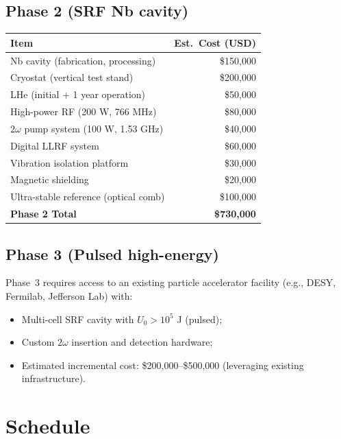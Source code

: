 \documentclass[12pt,letterpaper]{article}
\begin{document}
\subsection{Phase 2 (SRF Nb cavity)}

\begin{tabular}{lr}
\toprule
Item & Est.\ Cost (USD) \\
\midrule
Nb cavity (fabrication, processing) & \$150,000 \\
Cryostat (vertical test stand) & \$200,000 \\
LHe (initial + 1 year operation) & \$50,000 \\
High-power RF (200 W, 766 MHz) & \$80,000 \\
$2\omega$ pump system (100 W, 1.53 GHz) & \$40,000 \\
Digital LLRF system & \$60,000 \\
Vibration isolation platform & \$30,000 \\
Magnetic shielding & \$20,000 \\
Ultra-stable reference (optical comb) & \$100,000 \\
\midrule
\textbf{Phase 2 Total} & \textbf{\$730,000} \\
\bottomrule
\end{tabular}

\subsection{Phase 3 (Pulsed high-energy)}

Phase~3 requires access to an existing particle accelerator facility
(e.g., DESY, Fermilab, Jefferson Lab) with:
\begin{itemize}[noitemsep]
  \item Multi-cell SRF cavity with $U_0 > 10^5$ J (pulsed);
  \item Custom $2\omega$ insertion and detection hardware;
  \item Estimated incremental cost: \$200,000--\$500,000
    (leveraging existing infrastructure).
\end{itemize}

\section{Schedule}
\end{document}
